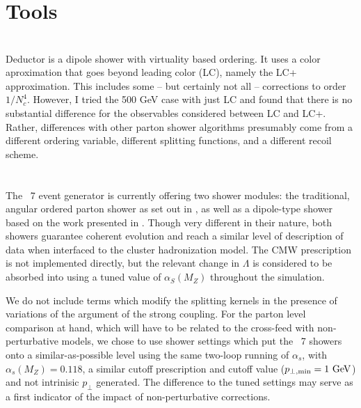 \section{Tools}
\label{sec:psunc:tools}

\section{\Deductor}
\label{sec:psunc:tools:decuctor}

Deductor is a dipole shower with virtuality based ordering. It uses a color
aproximation that goes beyond leading color (LC), namely the LC+
approximation. This includes some -- but certainly not all -- corrections to
order $1/N_c^4$. However, I tried the 500 GeV case with just LC and found that
there is no substantial difference for the observables considered between LC
and LC+. Rather, differences with other parton shower algorithms presumably
come from a different ordering variable, different splitting functions, and a
different recoil scheme.

\section{\Herwig}
\label{sec:psunc:tools:herwig}

The \Herwig~7 event generator \cite{Bellm:2015jjp} is currently offering two
shower modules: the traditional, angular ordered parton shower as set out in
\cite{Gieseke:2003rz}, as well as a dipole-type shower based on the work
presented in \cite{Platzer:2009jq,Platzer:2011bc}.
Though very different in their nature, both showers guarantee coherent
evolution and reach a similar level of description of data when interfaced to
the cluster hadronization model. The CMW prescription \cite{Catani:1990rr} is
not implemented directly, but the relevant change in $\Lambda$ is considered
to be absorbed into using a tuned value of $\alpha_S(M_Z)$ throughout the
simulation.

We do not include terms which modify the splitting kernels in the presence of
variations of the argument of the strong coupling. For the parton level
comparison at hand, which will have to be related to the cross-feed with
non-perturbative models, we chose to use shower settings which put the
\Herwig~7 showers onto a similar-as-possible level using the same two-loop
running of $\alpha_s$, with $\alpha_s(M_Z)=0.118$, a similar cutoff
prescription and cutoff value ($p_{\perp,\text{min}}=1\ {\rm GeV}$) and not
intrinisic $p_\perp$ generated. The difference to the tuned settings may serve
as a first indicator of the impact of non-perturbative corrections.


